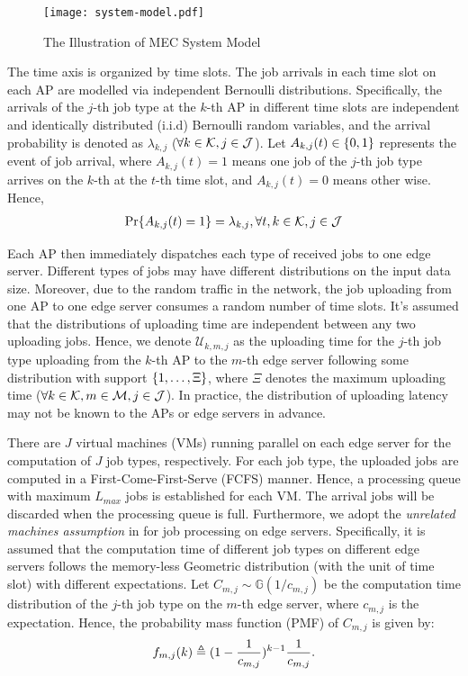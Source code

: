 \begin{figure}[ht]
    \centering
    \texttt{[image: system-model.pdf]}
    \caption{The Illustration of MEC System Model}
    \label{fig:system}
\end{figure}

The time axis is organized by time slots.
The job arrivals in each time slot on each AP are modelled via independent Bernoulli distributions.
Specifically, the arrivals of the $j$-th job type at the $k$-th AP in different time slots are independent and identically distributed (i.i.d) Bernoulli random variables, and the arrival probability is denoted as $\lambda_{k,j}$ ($\forall k\in\mathcal{K}, j\in\mathcal{J}$).
Let $A_{k,j}(t) \in \{0,1\}$ represents the event of job arrival, where $A_{k,j}(t)=1$ means one job of the $j$-th job type arrives on the $k$-th at the $t$-th time slot, and $A_{k,j}(t)=0$ means other wise.
Hence,
\begin{align}
    \Pr\{ A_{k,j}(t) = 1 \} = \lambda_{k,j}, \forall t,k\in\mathcal{K},j\in\mathcal{J}
\end{align}

Each AP then immediately dispatches each type of received jobs to one edge server.
Different types of jobs may have different distributions on the input data size.
Moreover, due to the random traffic in the network, the job uploading from one AP to one edge server consumes a random number of time slots.
It's assumed that the distributions of uploading time are independent between any two uploading jobs.
Hence, we denote $\mathcal{U}_{k,m,j}$ as the uploading time for the $j$-th job type uploading from the $k$-th AP to the $m$-th edge server following some distribution with support $\{1, \dots, \Xi\}$, where $\Xi$ denotes the maximum uploading time ($\forall k\in\mathcal{K}, m\in\mathcal{M}, j\in\mathcal{J}$).
In practice, the distribution of uploading latency may not be known to the APs or edge servers in advance.

There are $J$ virtual machines (VMs) running parallel on each edge server for the computation of $J$ job types, respectively.
For each job type, the uploaded jobs are computed in a First-Come-First-Serve (FCFS) manner.
Hence, a processing queue with maximum $L_{max}$ jobs is established for each VM.
The arrival jobs will be discarded when the processing queue is full.
Furthermore, we adopt the \emph{unrelated machines assumption} in \cite{tan-online} for job processing on edge servers.
Specifically, it is assumed that the computation time of different job types on different edge servers follows the memory-less Geometric distribution (with the unit of time slot) with different expectations.
Let $C_{m,j} \sim \mathbb{G}(1/c_{m,j})$ be the computation time distribution of the $j$-th job type on the $m$-th edge server, where $c_{m,j}$ is the expectation.
Hence, the probability mass function (PMF) of $C_{m,j}$ is given by:
\begin{align}
    f_{m,j}(k) \triangleq (1-\frac{1}{c_{m,j}})^{k-1} \frac{1}{c_{m,j}}.
\end{align}

